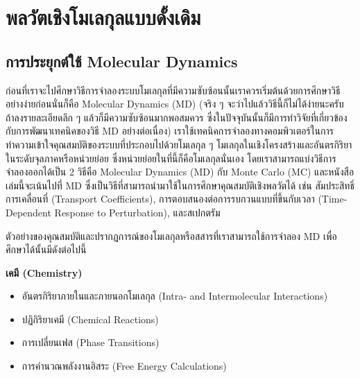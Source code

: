 

\chapter{พลวัตเชิงโมเลกุลแบบดั้งเดิม}
\label{ch:md}

\section{การประยุกต์ใช้ Molecular Dynamics}

ก่อนที่เราจะไปศึกษาวิธีการจำลองระบบโมเลกุลที่มีความซับซ้อนนั้นเราควรเริ่มต้นด้วยการศึกษาวิธีอย่างง่ายก่อนนั่นก็คือ Molecular Dynamics (MD) (จริง ๆ จะว่าไปแล้ววิธีนี้ก็ไม่ได้ง่ายนะครับ ถ้าลงรายละเอียดลึก ๆ แล้วก็มีความซับซ้อนมากพอสมควร ซึ่งในปัจจุบันนั้นก็มีการทำวิจัยที่เกี่ยวข้องกับการพัฒนาเทคนิคของวิธี MD อย่างต่อเนื่อง) เราใช้เทคนิคการจำลองทางคอมพิวเตอร์ในการทำความเข้าใจคุณสมบัติของระบบที่ประกอบไปด้วยโมเลกุล ๆ โมเลกุลในเชิงโครงสร้างและอันตรกิริยาในระดับจุลภาคหรือหน่วยย่อย ซึ่งหน่วยย่อยในที่นี้ก็คือโมเลกุลนั่นเอง โดยเราสามารถแบ่งวิธีการจำลองออกได้เป็น 2 วิธีคือ Molecular Dynamics (MD) กับ Monte Carlo (MC) และหนังสือเล่มนี้จะเน้นไปที่ MD ซึ่งเป็นวิธีที่สามารถนำมาใช้ในการศึกษาคุณสมบัติเชิงพลวัตได้ เช่น สัมประสิทธิ์การเคลื่อนที่ (Transport Coefficients), การตอบสนองต่อการรบกวนแบบที่ขึ้นกับเวลา (Time-Dependent Response to Perturbation), และสเปกตรัม

ตัวอย่างของคุณสมบัติและปรากฏการณ์ของโมเลกุลหรือสสารที่เราสามารถใช้การจำลอง MD เพื่อศึกษาได้นั้นมีดังต่อไปนี้

\noindent \textbf{เคมี (Chemistry)}
%
\begin{itemize}[topsep=0pt,noitemsep]
  \setlength\itemsep{0.5em}
  \item อันตรกิริยาภายในและภายนอกโมเลกุล (Intra- and Intermolecular Interactions)

  \item ปฏิกิริยาเคมี (Chemical Reactions)

  \item การเปลี่ยนเฟส (Phase Transitions)

  \item การคำนวณพลังงานอิสระ (Free Energy Calculations)
\end{itemize}

